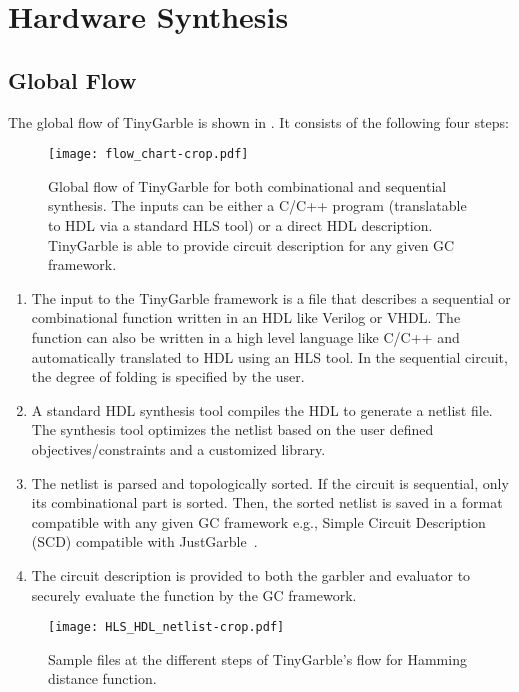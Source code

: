 \chapter{Hardware Synthesis}
\section{Global Flow}
The global flow of TinyGarble is shown in .
It consists of the following four steps:

\begin{figure}[ht]
\centering
\texttt{[image: flow\_chart-crop.pdf]}
\caption{Global flow of TinyGarble for both combinational and sequential synthesis.
  The inputs can be either a C/C++ program (translatable to HDL via a standard HLS tool) or a direct HDL description.
  TinyGarble is able to provide circuit description for any given GC framework.}
\label{fig:globalflow}
\end{figure}

\begin{enumerate}
\item
  The input to the TinyGarble framework is a file that describes a sequential or combinational function written in an HDL like Verilog or VHDL.
  The function can also be written in a high level language like C/C++ and automatically translated to HDL using an HLS tool.
  In the sequential circuit, the degree of folding is specified by the user.

\item
  A standard HDL synthesis tool compiles the HDL to generate a netlist file.
  The synthesis tool optimizes the netlist based on the user defined objectives/constraints and a customized library.

\item
  The netlist is parsed and topologically sorted.
  If the circuit is sequential, only its combinational part is sorted.
  Then, the sorted netlist is saved in a format compatible with any given GC framework e.g., Simple Circuit Description (SCD) compatible with JustGarble~\cite{bellare2013efficient}.

\item
  The circuit description is provided to both the garbler and evaluator to securely evaluate the function by the GC framework.
\end{enumerate}

\begin{figure}[ht]
\centering
\texttt{[image: HLS\_HDL\_netlist-crop.pdf]}
\caption{Sample files at the different steps of TinyGarble's flow for Hamming distance function.}
\label{fig:globalflow_sample}
\end{figure}

